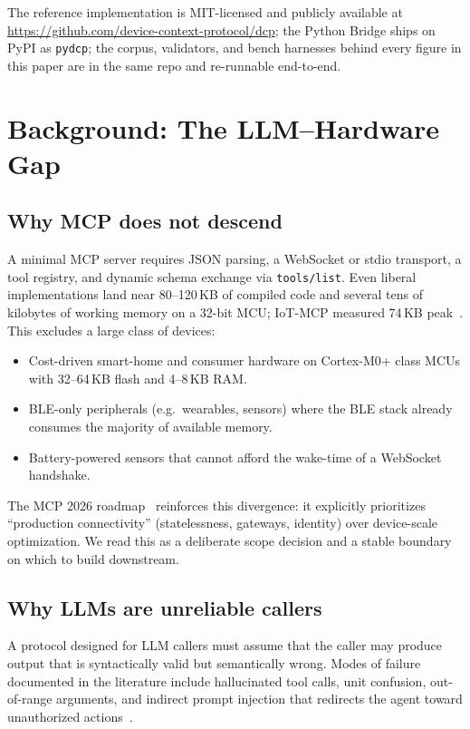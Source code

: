 \documentclass[11pt,a4paper]{article}
\begin{document}
The reference implementation is MIT-licensed and publicly available at
\url{https://github.com/device-context-protocol/dcp}; the Python Bridge
ships on PyPI as \texttt{pydcp}; the corpus, validators, and bench
harnesses behind every figure in this paper are in the same repo and
re-runnable end-to-end.

\section{Background: The LLM--Hardware Gap}

\subsection{Why MCP does not descend}

A minimal MCP server requires JSON parsing, a WebSocket or stdio transport,
a tool registry, and dynamic schema exchange via \texttt{tools/list}. Even
liberal implementations land near 80--120\,KB of compiled code and several
tens of kilobytes of working memory on a 32-bit MCU; IoT-MCP measured
74\,KB peak~\cite{iotmcp2025}. This excludes a large class of devices:

\begin{itemize}[leftmargin=*,nosep]
  \item Cost-driven smart-home and consumer hardware on Cortex-M0+ class MCUs
        with 32--64\,KB flash and 4--8\,KB RAM.
  \item BLE-only peripherals (e.g.\ wearables, sensors) where the BLE stack
        already consumes the majority of available memory.
  \item Battery-powered sensors that cannot afford the wake-time of a
        WebSocket handshake.
\end{itemize}

The MCP 2026 roadmap~\cite{mcp_roadmap_2026} reinforces this divergence: it
explicitly prioritizes ``production connectivity'' (statelessness, gateways,
identity) over device-scale optimization. We read this as a deliberate scope
decision and a stable boundary on which to build downstream.

\subsection{Why LLMs are unreliable callers}

A protocol designed for LLM callers must assume that the caller may produce
output that is syntactically valid but semantically wrong. Modes of failure
documented in the literature include hallucinated tool calls, unit confusion,
out-of-range arguments, and indirect prompt injection that redirects the
agent toward unauthorized actions~\cite{llm_hallucination,prompt_injection}.
\end{document}
